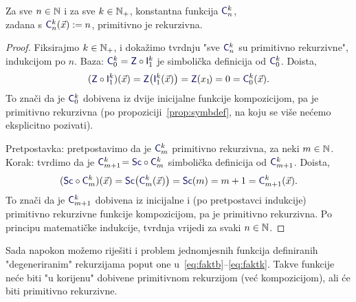 \begin{propozicija}[{name=[primitivna rekurzivnost konstantnih funkcija]}]\label{prop:konst}
Za sve $n\in{\mathbb N}$ i za sve $k\in{\mathbb N}_+$, konstantna funkcija $\f C_n^k$, \\ zadana s $\f C_n^k(\vec x):=n$, primitivno je rekurzivna.
\end{propozicija}
\begin{proof}
Fiksirajmo $k\in{\mathbb N}_+$, i dokažimo tvrdnju "sve $\f C_n^k$ su primitivno rekurzivne", \\ indukcijom po $n$. Baza: $\f C_0^k=\f Z\circ\f I_1^k$ je simbolička definicija od $\f C_0^k$. Doista,
\begin{equation}
    (\f Z\circ\f I_1^k)(\vec x)=\f Z\bigl(\f I_1^k(\vec x)\bigr)=\f Z(x_1\!)=0=\f C_0^k(\vec x)\text.
\end{equation}
To znači da je $\f C_0^k$ dobivena iz dvije inicijalne funkcije kompozicijom, pa je primitivno rekurzivna (po propoziciji~\ref{prop:symbdef}, na koju se više nećemo eksplicitno pozivati).

Pretpostavka: pretpostavimo da je $\f C_m^k$ primitivno rekurzivna, za neki $m\in{\mathbb N}$. 
Korak: tvrdimo da je $\f C_{m+1}^k\!=\f{Sc}\circ\f C_m^k$ simbolička definicija od $\f C_{m+1}^k$. Doista,
\begin{equation}
    (\f{Sc}\circ\f C_m^k)(\vec x)=\f{Sc}\bigl(\f C_m^k(\vec x)\bigr)=\f{Sc}(m)=m+1=\f C_{m+1}^k(\vec x)\text.
\end{equation}
To znači da je $\f C_{m+1}^k$ dobivena iz inicijalne i (po pretpostavci indukcije) primitivno rekurzivne funkcije kompozicijom, pa je primitivno rekurzivna. Po principu matematičke indukcije, tvrdnja vrijedi za svaki $n\in{\mathbb N}$.
\end{proof}

Sada napokon možemo riješiti i problem jednomjesnih funkcija definiranih "degeneriranim" rekurzijama poput one u~\eqref{eq:faktb}--\eqref{eq:faktk}. Takve funkcije neće biti "u korijenu" dobivene primitivnom rekurzijom (već kompozicijom), ali će biti primitivno rekurzivne.


